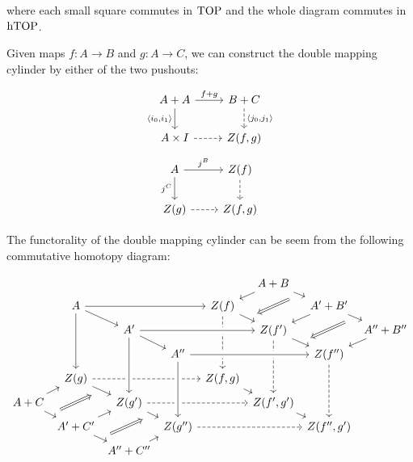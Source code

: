 where each small square commutes in $\operatorname{TOP}$ and the whole diagram commutes in $\operatorname{hTOP}$.

Given maps $f:A\to B$ and $g:A\to C$, we can construct the double mapping cylinder by either of the two pushouts:

\[\begin{tikzcd}
	{A+A} & {B+C} \\
	{A\times I} & {Z(f,g)}
	\arrow["{f+g}", from=1-1, to=1-2]
	\arrow["{\left<i_0,i_1\right>}"', from=1-1, to=2-1]
	\arrow[dashed, from=2-1, to=2-2]
	\arrow["{\left<j_0,j_1\right>}", dashed, from=1-2, to=2-2]
\end{tikzcd}\]
\[\begin{tikzcd}
	A & {Z(f)} \\
	{Z(g)} & {Z(f,g)}
	\arrow["{j^B}", from=1-1, to=1-2]
	\arrow["{j^C}"', from=1-1, to=2-1]
	\arrow[dashed, from=2-1, to=2-2]
	\arrow[dashed, from=1-2, to=2-2]
\end{tikzcd}\]

The functorality of the double mapping cylinder can be seem from the following commutative homotopy diagram:

\[\begin{tikzcd}[column sep=3pt,row sep=4pt]
	&&&&& {A+B} \\
	& A &&& {Z(f)} && {A'+B'} \\
	&& {A'} &&& {Z(f')} && {A''+B''} \\
	&&& {A''} &&& {Z(f'')} \\
	& {Z(g)} &&& {Z(f,g)} \\
	{A+C} && {Z(g')} &&& {Z(f',g')} \\
	& {A'+C'} && {Z(g'')} &&& {Z(f'',g')} \\
	&& {A''+C''}
	\arrow[from=2-2, to=3-3]
	\arrow[from=3-3, to=4-4]
	\arrow[from=2-2, to=2-5]
	\arrow[from=2-2, to=5-2]
	\arrow[dashed, from=5-2, to=5-5]
	\arrow[dashed, from=2-5, to=5-5]
	\arrow[from=1-6, to=2-5]
	\arrow[from=6-1, to=5-2]
	\arrow[dashed, from=4-7, to=7-7]
	\arrow[dashed, from=7-4, to=7-7]
	\arrow[dashed, from=3-6, to=6-6]
	\arrow[dashed, from=6-3, to=6-6]
	\arrow[from=5-5, to=6-6]
	\arrow[from=6-6, to=7-7]
	\arrow[from=7-2, to=6-3]
	\arrow[from=8-3, to=7-4]
	\arrow[from=2-7, to=3-6]
	\arrow[from=3-8, to=4-7]
	\arrow[from=3-3, to=6-3, crossing over]
	\arrow[from=4-4, to=7-4, crossing over]
	\arrow[from=4-4, to=4-7, crossing over]
	\arrow[from=3-3, to=3-6, crossing over]
	\arrow[""{name=0, anchor=center, inner sep=0}, from=5-2, to=6-3]
	\arrow[""{name=1, anchor=center, inner sep=0}, from=6-3, to=7-4]
	\arrow[""{name=2, anchor=center, inner sep=0}, from=2-5, to=3-6]
	\arrow[""{name=3, anchor=center, inner sep=0}, from=3-6, to=4-7]
	\arrow[""{name=4, anchor=center, inner sep=0}, from=1-6, to=2-7]
	\arrow[""{name=5, anchor=center, inner sep=0}, from=2-7, to=3-8]
	\arrow[""{name=6, anchor=center, inner sep=0}, from=6-1, to=7-2]
	\arrow[""{name=7, anchor=center, inner sep=0}, from=7-2, to=8-3]
	\arrow[shorten <=9pt, shorten >=9pt, Rightarrow, from=7, to=1]
	\arrow[shorten <=9pt, shorten >=9pt, Rightarrow, from=4, to=2]
	\arrow[shorten <=9pt, shorten >=9pt, Rightarrow, from=5, to=3]
	\arrow[shorten <=9pt, shorten >=9pt, Rightarrow, from=6, to=0]
\end{tikzcd}\]

